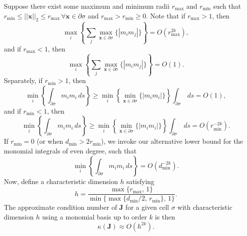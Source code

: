 Suppose there exist some maximum and minimum radii $r_{\max}$ and $r_{\min}$ such that $r_{\min} \leq || \mathbf{x} ||_2 \leq r_{\max} \, \forall \mathbf{x} \in \partial \sigma$ and  $r_{\max} > r_{\min} \geq 0$. Note that if $r_{\max} > 1$, then
\begin{equation}
        \max_i \left\{ \sum_{j} \max_{\mathbf{x} \in \partial \sigma} \{ | m_i m_j | \} \right\} = O (r_{\max}^{2k}),
\end{equation}
and if $r_{\max} < 1$, then
\begin{equation}
        \max_i \left\{ \sum_{j} \max_{\mathbf{x} \in \partial \sigma} \{ | m_i m_j | \} \right\} = O (1).
\end{equation}
Separately, if $r_{\min} > 1$, then
\begin{equation}
        \min_i \left\{ \int_{\partial \sigma} m_i m_i \, ds \right\} \geq \min_i \left\{ \min_{\mathbf{x} \in \partial \sigma} \{ | m_i m_i | \} \right\} \int_{\partial \sigma} \, ds = O (1),
\end{equation}
and if $r_{\min} < 1$, then
\begin{equation}
         \min_i \left\{ \int_{\partial \sigma} m_i m_i \, ds \right\} \geq \min_i \left\{ \min_{\mathbf{x} \in \partial \sigma} \{ | m_i m_i | \} \right\} \int_{\partial \sigma} \, ds = O (r_{\min}^{-2k}).
\end{equation}
If $r_{\min} = 0$ (or when $d_{\min} > 2r_{\min}$), we invoke our alternative lower bound for the monomial integrals of even degree, such that
\begin{equation}
         \min_i \left\{ \int_{\partial \sigma} m_i m_i \, ds \right\} = O (d_{\min}^{-2k}).
\end{equation}
Now, define a characteristic dimension $h$ satisfying
\begin{equation}
        h = \frac{\max \{ r_{\max}, \, 1 \}}{\min \{ \max \{d_{\min}/2, \, r_{\min} \}, \, 1 \}}.
\end{equation}
The approximate condition number of $\mathbf{J}$ for a given cell $\sigma$ with characteristic dimension $h$ using a monomial basis up to order $k$ is then
\begin{equation}
        \kappa (\mathbf{J}) \approx O(h^{2k}).
	\label{eq:estimate}
\end{equation}

